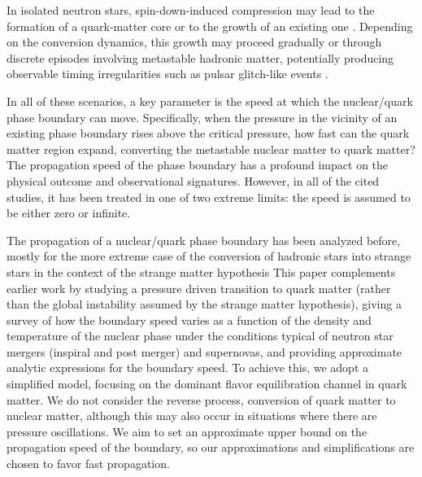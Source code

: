 \documentclass[10pt,superscriptaddress,
amsmath,aps,prc,twocolumn,nofootinbib,floatfix]{revtex4-1}
\newcommand{\mga}[1]{{\color[rgb]{0.6,0,0}#1}}
\begin{document}
In isolated neutron stars, spin-down-induced compression may lead to the formation of a quark-matter core or to the growth of an existing one \cite{Glendenning:1997fy, Prasad:2022dom}. Depending on the conversion dynamics, this growth may proceed gradually or through discrete episodes involving metastable hadronic matter, potentially producing observable timing irregularities such as pulsar glitch-like events \cite{Zdunik:2006uw}.

\mga{
In all of these scenarios, a key parameter is the speed at which the nuclear/quark phase boundary can move.
Specifically, when the pressure in the vicinity of
an existing phase boundary rises above the critical pressure, how fast can the quark matter region expand, converting the metastable nuclear matter to quark matter? The propagation speed of the
phase boundary} has a profound impact on the physical outcome and observational signatures. However, in all of the cited studies, it has been treated in one of two extreme limits: the speed is assumed to be either zero or infinite.

The propagation of a nuclear/quark phase boundary has been analyzed before, mostly for the more extreme case of the conversion of hadronic stars into strange stars in the context of the strange matter hypothesis \cite{Olinto:1986je,Horvath:1988nb,Heiselberg:1991px,Lugones:1994xg,Leahy:2007we,Pagliara:2013tza,Alford:2014jha,Drago:2015fpa,Furusawa:2015vfn,Niebergal:2010ds,Ouyed:2022toz} 
This paper complements earlier work by studying a pressure driven transition to quark matter (rather than the global instability assumed by the strange matter hypothesis), giving a survey of how the boundary speed varies as a function of the density and temperature of the nuclear phase under the conditions typical of neutron star mergers (inspiral and post merger) and supernovas, and providing approximate analytic expressions for the boundary speed.
To achieve this, we adopt a simplified model, focusing on the dominant flavor equilibration channel in quark matter. We do not consider the reverse process, conversion of quark matter to nuclear matter, although this may also occur in situations where there are pressure oscillations.  We aim to set an approximate upper bound on the propagation speed of the boundary, so our approximations and simplifications are chosen to favor fast propagation.  
\end{document}
